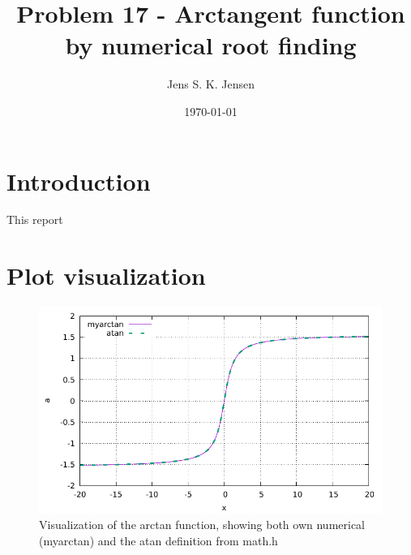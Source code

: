 \documentclass{article}
\begin{document}
\title{Problem 17 - Arctangent function by numerical root finding}
\author{Jens S. K. Jensen}
\date{\today}
\maketitle

\section{Introduction}
This report 

\section{Plot visualization}


\begin{figure}
	\centering
	\includegraphics{plot.pdf}
	\caption{Visualization of the arctan function, showing both own numerical (myarctan) and the atan definition from math.h}
	\label{fig:plot}
\end{figure}
\end{document}
